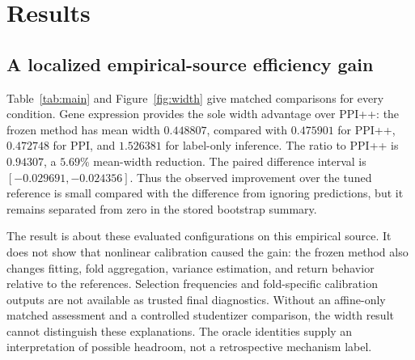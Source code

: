 \documentclass{article}
\begin{document}
\section{Results}
\subsection{A localized empirical-source efficiency gain}
Table~\ref{tab:main} and Figure~\ref{fig:width} give matched comparisons for every condition. Gene expression provides the sole width advantage over PPI++: the frozen method has mean width $0.448807$, compared with $0.475901$ for PPI++, $0.472748$ for PPI, and $1.526381$ for label-only inference. The ratio to PPI++ is $0.94307$, a $5.69\%$ mean-width reduction. The paired difference interval is $[-0.029691,-0.024356]$. Thus the observed improvement over the tuned reference is small compared with the difference from ignoring predictions, but it remains separated from zero in the stored bootstrap summary.

The result is about these evaluated configurations on this empirical source. It does not show that nonlinear calibration caused the gain: the frozen method also changes fitting, fold aggregation, variance estimation, and return behavior relative to the references. Selection frequencies and fold-specific calibration outputs are not available as trusted final diagnostics. Without an affine-only matched assessment and a controlled studentizer comparison, the width result cannot distinguish these explanations. The oracle identities supply an interpretation of possible headroom, not a retrospective mechanism label.
\end{document}
